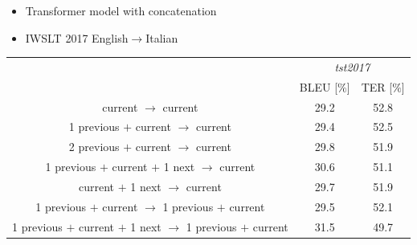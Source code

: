 \documentclass[11pt, a4paper, landscape]{article}
\begin{document}
\NewPage
{}
\vfill
\begin{itemize}
  \item Transformer model with concatenation
  \item IWSLT 2017 English$\to$Italian
\end{itemize}
\begin{table}
  \small
  \bf
  \begin{center}
    \begin{tabular}{c||cc}
      & \multicolumn{2}{c}{\textit{tst2017}} \\
      & BLEU [$\%$] & TER [$\%$] \\
      \toprule
      \toprule
      \phantom{1 previous $+$ }current\phantom{ $+$ 1 next} $\to$ \phantom{1 previous $+$ }current & 29.2 & 52.8 \\
      \midrule
      1 previous $+$ current\phantom{ $+$ 1 next} $\to$ \phantom{1 previous $+$ }current & 29.4 & 52.5 \\
      2 previous $+$ current\phantom{ $+$ 1 next} $\to$ \phantom{1 previous $+$ }current & 29.8 & 51.9 \\
      1 previous $+$ current $+$ 1 next $\to$ \phantom{1 previous $+$ }current & 30.6 & 51.1 \\
      \phantom{1 previous $+$ }current $+$ 1 next $\to$ \phantom{1 previous $+$ }current & 29.7 & 51.9 \\
      \midrule
      1 previous $+$ current\phantom{ $+$ 1 next} $\to$ 1 previous $+$ current & 29.5 & 52.1 \\
      1 previous $+$ current $+$ 1 next $\to$ 1 previous $+$ current & \alert{31.5} & \alert{49.7} \\
    \end{tabular}
  \end{center}
\end{table}
\vfill
\end{document}
